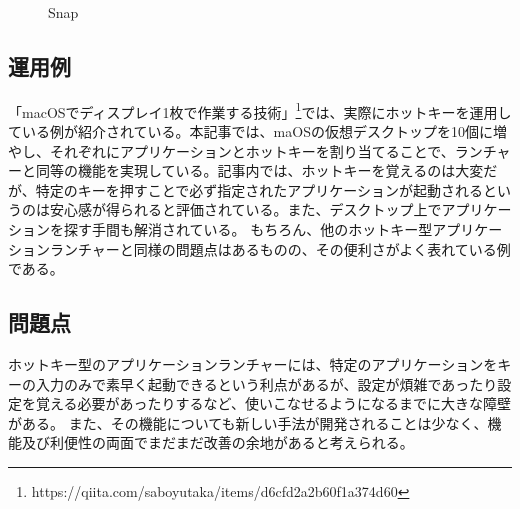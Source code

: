 \begin{figure}[h]
    \begin{center}
    \end{center}
    \caption{Snap}
    \label{fig:snap}
\end{figure}

\subsection{運用例}
「macOSでディスプレイ1枚で作業する技術」\footnote{https://qiita.com/saboyutaka/items/d6cfd2a2b60f1a374d60}では、実際にホットキーを運用している例が紹介されている。本記事では、maOSの仮想デスクトップを10個に増やし、それぞれにアプリケーションとホットキーを割り当てることで、ランチャーと同等の機能を実現している。記事内では、ホットキーを覚えるのは大変だが、特定のキーを押すことで必ず指定されたアプリケーションが起動されるというのは安心感が得られると評価されている。また、デスクトップ上でアプリケーションを探す手間も解消されている。
もちろん、他のホットキー型アプリケーションランチャーと同様の問題点はあるものの、その便利さがよく表れている例である。

\subsection{問題点}
ホットキー型のアプリケーションランチャーには、特定のアプリケーションをキーの入力のみで素早く起動できるという利点があるが、設定が煩雑であったり設定を覚える必要があったりするなど、使いこなせるようになるまでに大きな障壁がある。
また、その機能についても新しい手法が開発されることは少なく、機能及び利便性の両面でまだまだ改善の余地があると考えられる。

